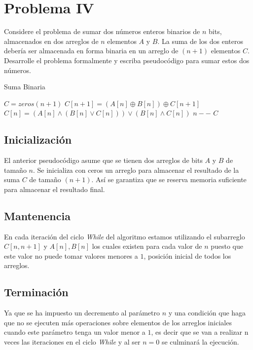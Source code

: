 \section{Problema IV}
Considere el problema de sumar dos números enteros binarios de $n$ bits, almacenados en dos arreglos de $n$ elementos $A$ y $B$. La suma de los dos enteros debería ser almacenada en forma binaria en un arreglo de $(n+1)$ elementos $C$. Desarrolle el problema formalmente y escriba pseudocódigo para sumar estos dos números. 

\begin{algorithm}[H]
    \caption{Suma Binaria}\label{alg:linear_search}
    \begin{algorithmic}[1]
            \State $C = zeros(n+1)$
                \State $C[n+1] = (A[n] \mathbin{\oplus} B[n]) \mathbin{\oplus} C[n+1]$
                \State $C[n] = (A[n] \land (B[n] \lor C[n])) \lor (B[n] \land C[n])$
                \State $n--$
            \EndWhile
            \Return $C$
        \EndProcedure
    \end{algorithmic}
\end{algorithm}

\subsection{Inicialización}
El anterior pseudocódigo asume que se tienen dos arreglos de bits $A$ y $B$ de tamaño $n$. Se inicializa con ceros un arreglo para almacenar el resultado de la suma $C$ de tamaño $(n+1)$. Así se garantiza que se reserva memoria suficiente para almacenar el resultado final.

\subsection{Mantenencia}
En cada iteración del ciclo \textit{While} del algoritmo estamos utilizando el subarreglo $C[n, n+1]$ y $A[n], B[n]$ los cuales existen para cada valor de $n$ puesto que este valor no puede tomar valores menores a $1$, posición inicial de todos los arreglos.
 
\subsection{Terminación}
Ya que se ha impuesto un decremento al parámetro $n$ y una condición que haga que no se ejecuten más operaciones sobre elementos de los arreglos iniciales cuando este parámetro tenga un valor menor a $1$, es decir que se van a realizar n veces las iteraciones en el ciclo \textit{While} y al ser $n = 0$ se culminará la ejecución.